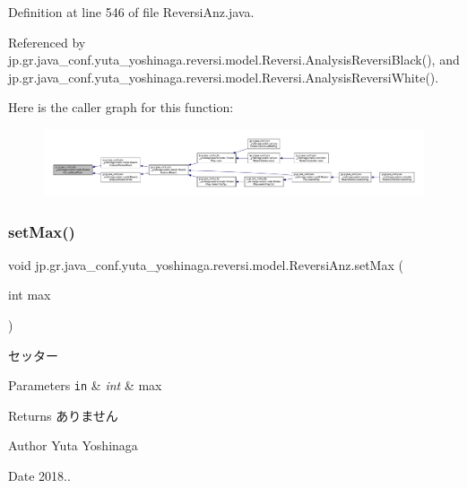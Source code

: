 Definition at line 546 of file Reversi\+Anz.\+java.



Referenced by jp.\+gr.\+java\+\_\+conf.\+yuta\+\_\+yoshinaga.\+reversi.\+model.\+Reversi.\+Analysis\+Reversi\+Black(), and jp.\+gr.\+java\+\_\+conf.\+yuta\+\_\+yoshinaga.\+reversi.\+model.\+Reversi.\+Analysis\+Reversi\+White().

Here is the caller graph for this function\+:
\nopagebreak
\begin{figure}[H]
\begin{center}
\leavevmode
\includegraphics[width=350pt]{classjp_1_1gr_1_1java__conf_1_1yuta__yoshinaga_1_1reversi_1_1model_1_1_reversi_anz_a50331f4e92029a1cf2ac365eb53f8449_icgraph}
\end{center}
\end{figure}
\mbox{\label{classjp_1_1gr_1_1java__conf_1_1yuta__yoshinaga_1_1reversi_1_1model_1_1_reversi_anz_a6afdf8999ea1596591c329c1bf089059}} 
\subsubsection{\texorpdfstring{set\+Max()}{setMax()}}
{\footnotesize\ttfamily void jp.\+gr.\+java\+\_\+conf.\+yuta\+\_\+yoshinaga.\+reversi.\+model.\+Reversi\+Anz.\+set\+Max (\begin{DoxyParamCaption}\item[{int}]{max }\end{DoxyParamCaption})}



セッター 


\begin{DoxyParams}[1]{Parameters}
\mbox{\tt in}  & {\em int} & max \\
\hline
\end{DoxyParams}
\begin{DoxyReturn}{Returns}
ありません 
\end{DoxyReturn}
\begin{DoxyAuthor}{Author}
Yuta Yoshinaga 
\end{DoxyAuthor}
\begin{DoxyDate}{Date}
2018.. 
\end{DoxyDate}


